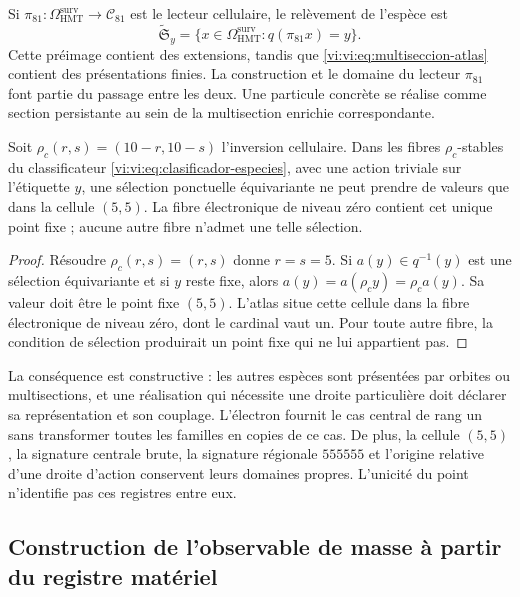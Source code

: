Si $\pi_{81}:\Omega^{\mathrm{surv}}_{\mathrm{HMT}}\to
\mathcal C_{81}$ est le lecteur cellulaire, le relèvement de l’espèce est
\begin{equation}
 \widetilde{\mathfrak S}_y
 =\{x\in\Omega^{\mathrm{surv}}_{\mathrm{HMT}}:
                  q(\pi_{81}x)=y\}.
 \label{vi:vi:eq:multiseccion-enriquecida}
\end{equation}
Cette préimage contient des extensions, tandis que
\eqref{vi:vi:eq:multiseccion-atlas} contient des présentations finies. La
construction et le domaine du lecteur $\pi_{81}$ font partie du passage
entre les deux. Une particule concrète se réalise comme section persistante
au sein de la multisection enrichie correspondante.

\begin{theorem}
\label{vi:vi:thm:selector-central}
Soit $\rho_c(r,s)=(10-r,10-s)$ l’inversion cellulaire. Dans les fibres
$\rho_c$-stables du classificateur \eqref{vi:vi:eq:clasificador-especies},
avec une action triviale sur l’étiquette $y$, une sélection ponctuelle
équivariante ne peut prendre de valeurs que dans la cellule $(5,5)$. La fibre
électronique de niveau zéro contient cet unique point fixe ; aucune autre
fibre n’admet une telle sélection.
\end{theorem}
\begin{proof}
Résoudre $\rho_c(r,s)=(r,s)$ donne $r=s=5$. Si $a(y)\in q^{-1}(y)$
est une sélection équivariante et si $y$ reste fixe, alors
$a(y)=a(\rho_c y)=\rho_c a(y)$. Sa valeur doit être le point fixe
$(5,5)$. L’atlas situe cette cellule dans la fibre électronique de niveau
zéro, dont le cardinal vaut un. Pour toute autre fibre, la condition
de sélection produirait un point fixe qui ne lui appartient pas.
\end{proof}

La conséquence est constructive : les autres espèces sont présentées par
orbites ou multisections, et une réalisation qui nécessite une droite
particulière doit déclarer sa représentation et son couplage.
L’électron fournit le cas central de rang un sans transformer toutes
les familles en copies de ce cas. De plus, la cellule $(5,5)$, la signature
centrale brute, la signature régionale $555555$ et l’origine relative d’une
droite d’action conservent leurs domaines propres. L’unicité du point
n’identifie pas ces registres entre eux.

\subsection{Construction de l’observable de masse à partir du registre matériel}
\label{vi:vi:subsec:particula-observable}

